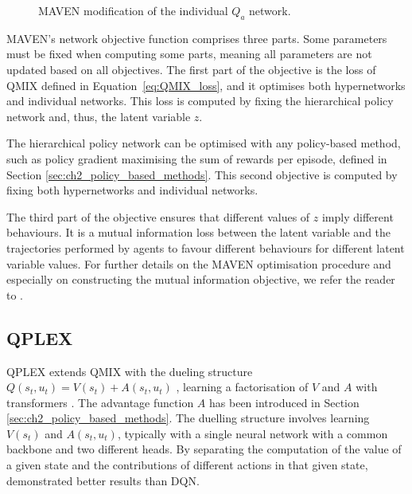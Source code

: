 \begin{figure}
\centering

\caption{MAVEN modification of the individual $Q_a$ network.}
\label{fig:maven}
\end{figure}

MAVEN's network objective function comprises three parts.
Some parameters must be fixed when computing some parts, meaning all parameters are not updated based on all objectives.
The first part of the objective is the loss of QMIX defined in Equation~\ref{eq:QMIX_loss}, and it optimises both hypernetworks and individual networks.
This loss is computed by fixing the hierarchical policy network and, thus, the latent variable $z$.

The hierarchical policy network can be optimised with any policy-based method, such as policy gradient maximising the sum of rewards per episode, defined in Section \ref{sec:ch2_policy_based_methods}.
This second objective is computed by fixing both hypernetworks and individual networks.

The third part of the objective ensures that different values of $z$ imply different behaviours. 
It is a mutual information loss between the latent variable and the trajectories performed by agents to favour different behaviours for different latent variable values.
For further details on the MAVEN optimisation procedure and especially on constructing the mutual information objective, we refer the reader to \cite{Mahajan2019MAVEN:Exploration}.

\subsection{QPLEX}
QPLEX \citep{wang2021qplex} extends QMIX with the dueling structure $Q(s_t, u_t) = V(s_t) + A(s_t, u_t)$ \citep{wang2016dueling}, learning a factorisation of $V$ and $A$ with transformers \citep{vaswani2017attention}.
The advantage function $A$ has been introduced in Section \ref{sec:ch2_policy_based_methods}.
The duelling structure involves learning $V(s_t)$ and $A(s_t, u_t)$, typically with a single neural network with a common backbone and two different heads.
By separating the computation of the value of a given state and the contributions of different actions in that given state, \citet{wang2016dueling} demonstrated better results than DQN.

